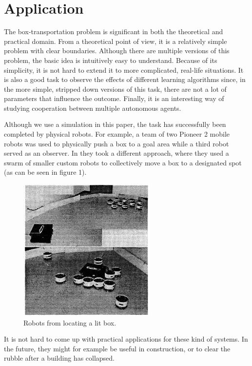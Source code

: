 \section{Application}
The box-transportation problem is significant in both the theoretical and practical domain.
From a theoretical point of view, it is a relatively simple problem with clear boundaries.
Although there are multiple versions of this problem, the basic idea is intuitively easy to understand.
Because of its simplicity, it is not hard to extend it to more complicated, real-life situations.
It is also a good task to observe the effects of different learning algorithms since, in the more simple, stripped down versions of this task, there are not a lot of parameters that influence the outcome.
Finally, it is an interesting way of studying cooperation between multiple autonomous agents.

 Although we use a simulation in this paper, the task has successfully been completed by physical robots.
For example, a team of two Pioneer 2 mobile robots was used to physically push a box to a goal area while a third robot served as an observer\cite{mataric2002}.
In \cite{kube1996} they took a different approach, where they used a swarm of smaller custom robots to collectively move a box to a designated spot (as can be seen in figure 1).
\begin{figure}
	\centering
	\includegraphics{images/swarmPushing.png}
	\caption{Robots from \cite{kube1996} locating a lit box.}
	\label{fig:robots}
\end{figure}
It is not hard to come up with practical applications for these kind of systems.
In the future, they might for example be useful in construction, or to clear the rubble after a building has collapsed.\\
